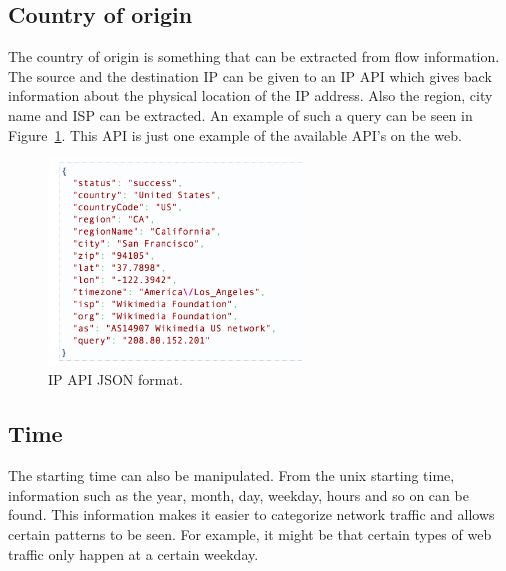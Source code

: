 \subsection{Country of origin}
The country of origin is something that can be extracted from flow information. The source and the destination IP can be given to an IP API which gives back information about the physical location of the IP address. Also the region, city name and ISP can be extracted. An example of such a query can be seen in Figure~\ref{fig:ipapi}. This API is just one example of the available API's on the web. \cite{ipAPI}

\begin{figure}[H]
\centering
\includegraphics[width=0.6\textwidth]{Figures/ip-api}
\decoRule
\caption[IP API JSON format]{IP API JSON format. \cite{ipAPI}}
\label{fig:ipapi}
\end{figure}

\subsection{Time}
\label{timeflow}
The starting time can also be manipulated. From the unix starting time, information such as the year, month, day, weekday, hours and so on can be found. This information makes it easier to categorize network traffic and allows certain patterns to be seen. For example, it might be that certain types of web traffic only happen at a certain weekday.



